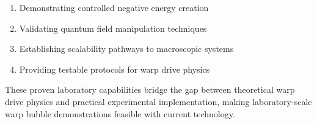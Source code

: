 \begin{enumerate}
\item Demonstrating controlled negative energy creation
\item Validating quantum field manipulation techniques
\item Establishing scalability pathways to macroscopic systems
\item Providing testable protocols for warp drive physics
\end{enumerate}

These proven laboratory capabilities bridge the gap between theoretical warp drive physics and practical experimental implementation, making laboratory-scale warp bubble demonstrations feasible with current technology.
